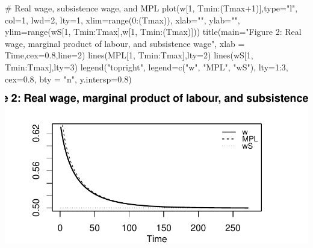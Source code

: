 \documentclass[
  letterpaper,
  DIV=11,
  numbers=noendperiod]{scrreprt}
\newenvironment{Shaded}{\begin{snugshade}}{\end{snugshade}}
\newcommand{\AttributeTok}[1]{\textcolor[rgb]{0.40,0.45,0.13}{#1}}
\newcommand{\CommentTok}[1]{\textcolor[rgb]{0.37,0.37,0.37}{#1}}
\newcommand{\DecValTok}[1]{\textcolor[rgb]{0.68,0.00,0.00}{#1}}
\newcommand{\FloatTok}[1]{\textcolor[rgb]{0.68,0.00,0.00}{#1}}
\newcommand{\FunctionTok}[1]{\textcolor[rgb]{0.28,0.35,0.67}{#1}}
\newcommand{\NormalTok}[1]{\textcolor[rgb]{0.00,0.23,0.31}{#1}}
\newcommand{\SpecialCharTok}[1]{\textcolor[rgb]{0.37,0.37,0.37}{#1}}
\newcommand{\StringTok}[1]{\textcolor[rgb]{0.13,0.47,0.30}{#1}}
\begin{document}
\begin{Shaded}
\begin{Highlighting}[]
\CommentTok{\# Real wage, subsistence wage, and MPL}
\FunctionTok{plot}\NormalTok{(w[}\DecValTok{1}\NormalTok{, Tmin}\SpecialCharTok{:}\NormalTok{(Tmax}\SpecialCharTok{+}\DecValTok{1}\NormalTok{)],}\AttributeTok{type=}\StringTok{"l"}\NormalTok{, }\AttributeTok{col=}\DecValTok{1}\NormalTok{, }\AttributeTok{lwd=}\DecValTok{2}\NormalTok{, }\AttributeTok{lty=}\DecValTok{1}\NormalTok{, }\AttributeTok{xlim=}\FunctionTok{range}\NormalTok{(}\DecValTok{0}\SpecialCharTok{:}\NormalTok{(Tmax)), }\AttributeTok{xlab=}\StringTok{""}\NormalTok{, }\AttributeTok{ylab=}\StringTok{""}\NormalTok{, }\AttributeTok{ylim=}\FunctionTok{range}\NormalTok{(wS[}\DecValTok{1}\NormalTok{, Tmin}\SpecialCharTok{:}\NormalTok{Tmax],w[}\DecValTok{1}\NormalTok{, Tmin}\SpecialCharTok{:}\NormalTok{(Tmax)])) }
\FunctionTok{title}\NormalTok{(}\AttributeTok{main=}\StringTok{"Figure 2: Real wage, marginal product of labour, and subsistence wage"}\NormalTok{, }\AttributeTok{xlab =} \StringTok{\textquotesingle{}Time\textquotesingle{}}\NormalTok{,}\AttributeTok{cex=}\FloatTok{0.8}\NormalTok{,}\AttributeTok{line=}\DecValTok{2}\NormalTok{)}
\FunctionTok{lines}\NormalTok{(MPL[}\DecValTok{1}\NormalTok{, Tmin}\SpecialCharTok{:}\NormalTok{Tmax],}\AttributeTok{lty=}\DecValTok{2}\NormalTok{)}
\FunctionTok{lines}\NormalTok{(wS[}\DecValTok{1}\NormalTok{, Tmin}\SpecialCharTok{:}\NormalTok{Tmax],}\AttributeTok{lty=}\DecValTok{3}\NormalTok{)}
\FunctionTok{legend}\NormalTok{(}\StringTok{"topright"}\NormalTok{, }\AttributeTok{legend=}\FunctionTok{c}\NormalTok{(}\StringTok{"w"}\NormalTok{, }\StringTok{"MPL"}\NormalTok{, }\StringTok{"wS"}\NormalTok{),}
       \AttributeTok{lty=}\DecValTok{1}\SpecialCharTok{:}\DecValTok{3}\NormalTok{, }\AttributeTok{cex=}\FloatTok{0.8}\NormalTok{, }\AttributeTok{bty =} \StringTok{"n"}\NormalTok{, }\AttributeTok{y.intersp=}\FloatTok{0.8}\NormalTok{)}
\end{Highlighting}
\end{Shaded}

\includegraphics{a_ricardian_one_sector_model_files/figure-pdf/ricardo1_2-2.pdf}
\end{document}

